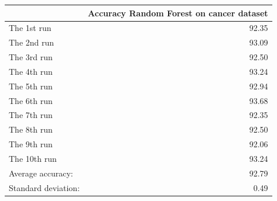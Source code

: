 \begin{tabular}{lr}
\toprule
{} &  Accuracy Random Forest on cancer dataset \\
\midrule
The 1st run         &                                     92.35 \\
The 2nd run         &                                     93.09 \\
The 3rd run         &                                     92.50 \\
The 4th run         &                                     93.24 \\
The 5th run         &                                     92.94 \\
The 6th run         &                                     93.68 \\
The 7th run         &                                     92.35 \\
The 8th run         &                                     92.50 \\
The 9th run         &                                     92.06 \\
The 10th run        &                                     93.24 \\
Average accuracy:   &                                     92.79 \\
Standard deviation: &                                      0.49 \\
\bottomrule
\end{tabular}
